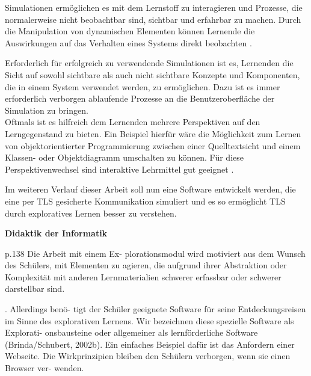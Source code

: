 \begin{quote}
 \cite{niegemann08}
\end{quote}

Simulationen ermöglichen es mit dem Lernstoff zu interagieren und Prozesse, die normalerweise nicht beobachtbar sind, sichtbar und erfahrbar zu machen. Durch die Manipulation von dynamischen Elementen können Lernende die Auswirkungen auf das Verhalten eines Systems direkt beobachten \cite{niegemann08}.

Erforderlich für erfolgreich zu verwendende Simulationen ist es, Lernenden die Sicht auf sowohl sichtbare als auch nicht sichtbare Konzepte und Komponenten, die in einem System verwendet werden, zu ermöglichen. Dazu ist es immer erforderlich verborgen ablaufende Prozesse an die Benutzeroberfläche der Simulation zu bringen. \\
Oftmals ist es hilfreich dem Lernenden mehrere Perspektiven auf den Lerngegenstand zu bieten. Ein Beispiel hierfür wäre die Möglichkeit zum Lernen von objektorientierter Programmierung zwischen einer Quelltextsicht und einem Klassen- oder Objektdiagramm umschalten zu können. Für diese Perspektivenwechsel sind interaktive Lehrmittel gut geeignet \cite{schubert11}.

Im weiteren Verlauf dieser Arbeit soll nun eine Software entwickelt werden, die eine per TLS gesicherte Kommunikation simuliert und es so ermöglicht TLS durch exploratives Lernen besser zu verstehen.



\hrulefill{}

\textbf{Didaktik der Informatik}

p.138
 Die Arbeit mit einem Ex-
plorationsmodul wird motiviert aus dem Wunsch des Schülers, mit Elementen 
zu  agieren,  die  aufgrund  ihrer  Abstraktion  oder  Komplexität  mit  anderen 
Lernmaterialien schwerer erfassbar oder schwerer darstellbar sind. 

. Allerdings benö-
tigt der Schüler geeignete Software für seine Entdeckungsreisen im Sinne des 
explorativen  Lernens.  Wir  bezeichnen  diese  spezielle  Software  als  Explorati-
onsbausteine  oder  allgemeiner  als  lernförderliche  Software (Brinda/Schubert, 
2002b).  Ein  einfaches  Beispiel  dafür  ist  das  Anfordern  einer  Webseite.  Die 
Wirkprinzipien bleiben den Schülern verborgen, wenn sie einen Browser ver-
wenden. 

